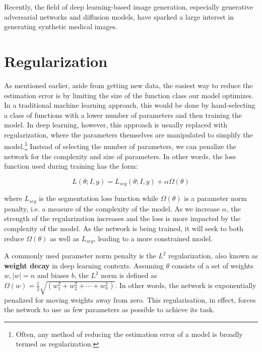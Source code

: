 Recently, the field of deep learning-based image generation, especially generative adversarial networks and diffusion models, have sparked a large interest in generating synthetic medical images.  

\section{Regularization}

As mentioned earlier, aside from getting new data, the easiest way to reduce the estimation error is by limiting the size of the function class our model optimizes. In a traditional machine learning approach, this would be done by hand-selecting a class of functions with a lower number of parameters and then training the model. In deep learning, however, this approach is usually replaced with regularization, where the parameters themselves are manipulated to simplify the model.\footnote{Often, any method of reducing the estimation error of a model is broadly termed as regularization.} Instead of selecting the number of parameters, we can penalize the network for the complexity and size of parameters.  In other words, the loss function used during training has the form:

\begin{equation}
	L(\theta; I, y) = L_{seg}(\theta; I, y) + \alpha\Omega(\theta)
\end{equation}

where $L_{seg}$ is the segmentation loss function while $\Omega(\theta)$ is a parameter norm penalty, i.e. a measure of the complexity of the model. As we increase $\alpha$, the strength of the regularization increases and the loss is more impacted by the complexity of the model. As the network is being trained, it will seek to both reduce $\Omega(\theta)$ as well as $L_{seg}$, leading to a more constrained model.

A commonly used parameter norm penalty is the $L^2$ regularization, also known as \textbf{weight decay} in deep learning contexts. Assuming $\theta$ consists of a set of weights $w, |w| = n$ and biases $b$, the $L^2$ norm is defined as $\Omega(w) = \frac{1}{2}\sqrt{(w_1^2 + w_2^2 + \cdots + w_n^2)}$. In other words, the network is exponentially penalized for moving weights away from zero. This regularisation, in effect, forces the network to use as few parameters as possible to achieve its task.

